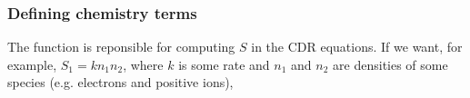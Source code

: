 \documentclass[letterpaper,10pt,english]{sphinxmanual}
\begin{document}
\begin{sphinxVerbatim}[commandchars=\\\{\},formatcom=\scriptsize]
           
                                                      
                                                      
                                                    
     
   \PYG{p}{[}\PYG{p}{]}  
    
\end{sphinxVerbatim}


\subsubsection{Defining chemistry terms}
\label{\detokenize{MinimalPlasmaModel:defining-chemistry-terms}}
The function  is reponsible for computing \(S\) in the CDR equations. If we want, for example, \(S_1 = k n_1n_2\), where \(k\) is some rate and \(n_1\) and \(n_2\) are densities of some species (e.g. electrons and positive ions),
\end{document}
